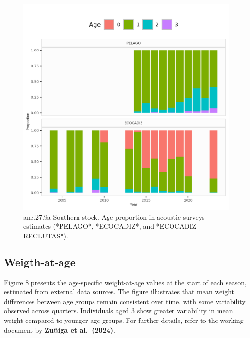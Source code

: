 \documentclass[
]{article}
\begin{document}
\begin{figure}[H]

{\centering \includegraphics[width=0.95\linewidth]{report/run/S1.0_4FLEETS_SelECO_RecIndex_Mnewfix/fig_agecomp_by_quartersSurveys} 

}

\caption{ane.27.9a Southern stock. Age proportion in acoustic surveys estimates  (*PELAGO*, *ECOCADIZ*, and *ECOCADIZ-RECLUTAS*).}\label{fig:unnamed-chunk-34}
\end{figure}

\hypertarget{weigth-at-age}{%
\subsection{Weigth-at-age}\label{weigth-at-age}}

Figure 8 presents the age-specific weight-at-age values at the start of
each season, estimated from external data sources. The figure
illustrates that mean weight differences between age groups remain
consistent over time, with some variability observed across quarters.
Individuals aged 3 show greater variability in mean weight compared to
younger age groups. For further details, refer to the working document
by \textbf{Zuñiga et al.~(2024)}.
\end{document}
